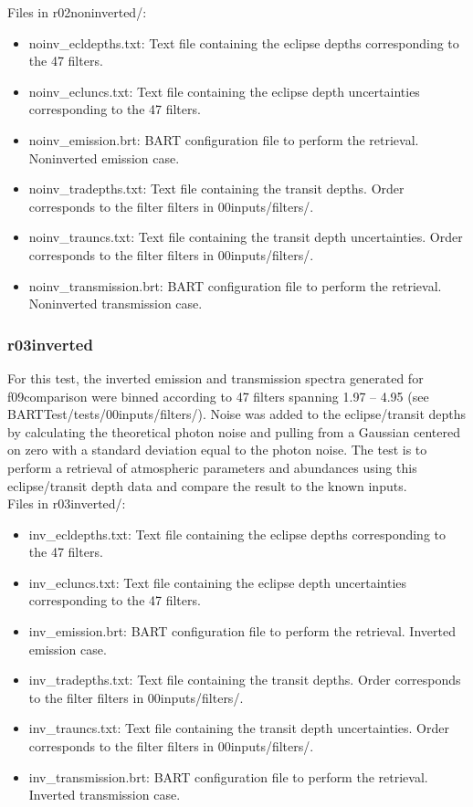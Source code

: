 \documentclass[letterpaper, 12pt]{article}
\begin{document}
Files in r02noninverted/:
\begin{itemize} \itemsep0pt
  \item noinv{\_}ecldepths.txt: Text file containing the eclipse depths 
        corresponding to the 47 filters.
  \item noinv{\_}ecluncs.txt: Text file containing the eclipse depth 
        uncertainties corresponding to the 47 filters.
  \item noinv{\_}emission.brt: BART configuration file to perform the 
        retrieval. 
        Noninverted emission case.
  \item noinv{\_}tradepths.txt: Text file containing the transit depths. Order 
        corresponds to the filter filters in 00inputs/filters/.
  \item noinv{\_}trauncs.txt: Text file containing the transit depth 
        uncertainties. 
        Order corresponds to the filter filters in 00inputs/filters/.
  \item noinv{\_}transmission.brt: BART configuration file to perform the 
        retrieval. Noninverted transmission case.
\end{itemize}

\subsubsection{r03inverted}
For this test, the inverted emission and transmission spectra generated for 
f09comparison were binned according to 47 filters spanning 
1.97 -- 4.95 \microns (see BARTTest/tests/00inputs/filters/). 
Noise was added to the eclipse/transit 
depths by calculating the theoretical photon noise and pulling from a Gaussian 
centered on zero with a standard deviation equal to the photon noise. The test 
is to perform a retrieval of atmospheric parameters and abundances using this 
eclipse/transit depth data and compare the result to the known inputs.\\

Files in r03inverted/:
\begin{itemize} \itemsep0pt
  \item inv{\_}ecldepths.txt: Text file containing the eclipse depths 
        corresponding to the 47 filters.
  \item inv{\_}ecluncs.txt: Text file containing the eclipse depth 
        uncertainties corresponding to the 47 filters.
  \item inv{\_}emission.brt: BART configuration file to perform the retrieval. 
        Inverted emission case.
  \item inv{\_}tradepths.txt: Text file containing the transit depths. Order 
        corresponds to the filter filters in 00inputs/filters/.
  \item inv{\_}trauncs.txt: Text file containing the transit depth 
        uncertainties. 
        Order corresponds to the filter filters in 00inputs/filters/.
  \item inv{\_}transmission.brt: BART configuration file to perform the 
        retrieval. Inverted transmission case.
\end{itemize}
\end{document}
